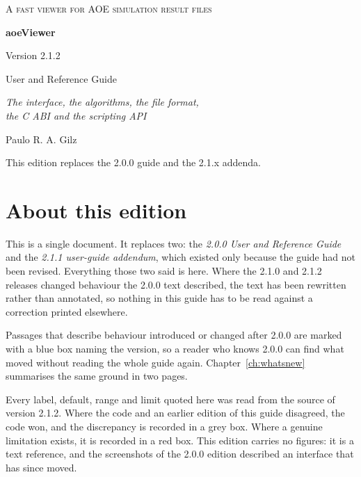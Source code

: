 \documentclass[11pt,a4paper,oneside]{report}
\newcommand{\appver}{2.1.2}
\begin{document}
\begin{titlepage}
\centering
\vspace*{3cm}
{\small\scshape\color{aoeaccent} A fast viewer for AOE simulation result files\par}
\vspace{2.2cm}
{\Huge\bfseries aoeViewer\par}
\vspace{0.5cm}
{\Large Version \appver\par}
\vspace{2.4cm}
{\LARGE User and Reference Guide\par}
\vspace{0.6cm}
{\large\itshape The interface, the algorithms, the file format,\\
the C ABI and the scripting API\par}
\vspace{3cm}
{\large Paulo R. A. Gilz\par}
\vfill
{\small This edition replaces the 2.0.0 guide and the 2.1.x addenda.\par}
\end{titlepage}

\tableofcontents
\clearpage

\chapter*{About this edition}

This is a single document. It replaces two: the \emph{2.0.0 User and Reference
Guide} and the \emph{2.1.1 user-guide addendum}, which existed only because
the guide had not been revised. Everything those two said is here. Where the
2.1.0 and \appver{} releases changed behaviour the 2.0.0 text described, the
text has been rewritten rather than annotated, so nothing in this guide has to
be read against a correction printed elsewhere.

Passages that describe behaviour introduced or changed after 2.0.0 are marked
with a blue box naming the version, so a reader who knows 2.0.0 can find what
moved without reading the whole guide again. Chapter~\ref{ch:whatsnew}
summarises the same ground in two pages.

Every label, default, range and limit quoted here was read from the source of
version \appver. Where the code and an earlier edition of this guide
disagreed, the code won, and the discrepancy is recorded in a grey box. Where a
genuine limitation exists, it is recorded in a red box. This edition carries no
figures: it is a text reference, and the screenshots of the 2.0.0 edition
described an interface that has since moved.
\end{document}
